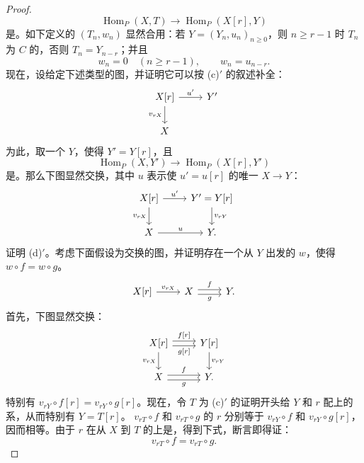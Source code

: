 \begin{proof}
\[
\operatorname{Hom}_P(X,T)\longrightarrow\operatorname{Hom}_P(X[r],Y)
\]
是。如下定义的 $(T_n,w_n)$ 显然合用：若 $Y=(Y_n,u_n)_{n\geq0}$，则 $n\geq r-1$ 时 $T_n$ 为 $C$ 的，否则 $T_n=Y_{n-r}$；并且
\[
w_n=0\quad(n\geq r-1),\qquad w_n=u_{n-r}.
\]
现在，设给定下述类型的图，并证明它可以按 (c)$'$ 的叙述补全：
\[
\begin{tikzcd}X[r]\arrow[r,"u'"]\arrow[d,"v_{rX}"']&Y'\\X&\end{tikzcd}
\]
为此，取一个 $Y$，使得 $Y'=Y[r]$，且
\[
\operatorname{Hom}_P(X,Y')\longrightarrow\operatorname{Hom}_P(X[r],Y')
\]
是。那么下图显然交换，其中 $u$ 表示使 $u'=u[r]$ 的唯一 $X\to Y$：
\[
\begin{tikzcd}X[r]\arrow[r,"u'"]\arrow[d,"v_{rX}"']&Y'=Y[r]\arrow[d,"v_{rY}"]\\X\arrow[r,"u"]&Y.\end{tikzcd}
\]
证明 (d)$'$。考虑下面假设为交换的图，并证明存在一个从 $Y$ 出发的 $w$，使得 $w\circ f=w\circ g$。
\[
\begin{tikzcd}X[r]\arrow[r,"v_{rX}"]&X\arrow[r,shift left,"f"]\arrow[r,shift right,"g"']&Y.\end{tikzcd}
\]
首先，下图显然交换：
\[
\begin{tikzcd}X[r]\arrow[r,shift left,"{f[r]}"]\arrow[r,shift right,"{g[r]}"']\arrow[d,"v_{rX}"']&Y[r]\arrow[d,"v_{rY}"]\\X\arrow[r,shift left,"f"]\arrow[r,shift right,"g"']&Y.\end{tikzcd}
\]
特别有 $v_{rY}\circ f[r]=v_{rY}\circ g[r]$。现在，令 $T$ 为 (c)$'$ 的证明开头给 $Y$ 和 $r$ 配上的系，从而特别有 $Y=T[r]$。
 $v_{rT}\circ f$ 和 $v_{rT}\circ g$ 的 $r$ 分别等于 $v_{rY}\circ f$ 和 $v_{rY}\circ g[r]$，因而相等。由于 $r$ 在从 $X$ 到 $T$ 的上是，得到下式，断言即得证：
\[
v_{rT}\circ f=v_{rT}\circ g.
\]
\end{proof}
